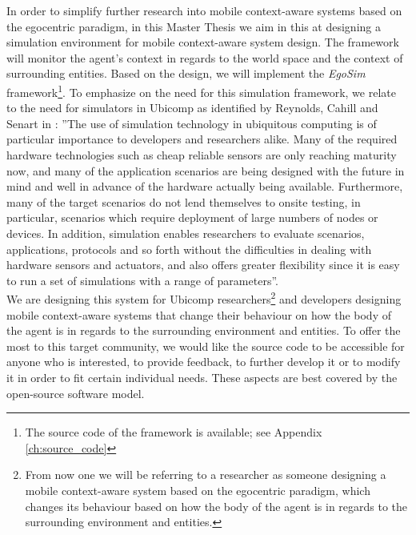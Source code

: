 In order to simplify further research into mobile context-aware systems based on the egocentric paradigm, in this Master Thesis we aim in this at designing a simulation environment for mobile context-aware system design. The framework will monitor the agent's context in regards to the world space and the context of surrounding entities. Based on the design, we will implement the \emph{EgoSim} framework\footnote{The source code of the framework is available; see Appendix \ref{ch:source_code}}. To emphasize on the need for this simulation framework, we relate to the need for simulators in Ubicomp as identified by Reynolds, Cahill and Senart in \cite{reynolds2006requirements}: ''The use of simulation technology in ubiquitous computing is of particular importance to developers and researchers alike. Many of the required hardware technologies such as cheap reliable sensors are only reaching maturity now, and many of the application scenarios are being designed with the future in mind and well in advance of the hardware actually being available. Furthermore, many of the target scenarios do not lend themselves to onsite testing, in particular, scenarios which require deployment of large numbers of nodes or devices. In addition, simulation enables researchers to evaluate scenarios, applications, protocols and so forth without the difficulties in dealing with hardware sensors and actuators, and also offers greater flexibility since it is easy to run a set of simulations with a range of parameters''.\\

We are designing this system for Ubicomp researchers\footnote{From now one we will be referring to a researcher as someone designing a mobile context-aware system based on the egocentric paradigm, which changes its behaviour based on how the body of the agent is in regards to the surrounding environment and entities.} and developers designing mobile context-aware systems that change their behaviour on how the body of the agent is in regards to the surrounding environment and entities. To offer the most to this target community, we would like the source code to be accessible for anyone who is interested, to provide feedback, to further develop it or to modify it in order to fit certain individual needs. These aspects are best covered by the open-source software model.\\









